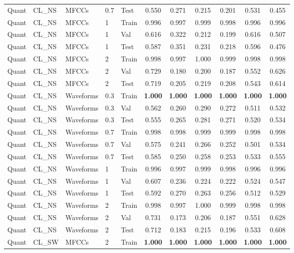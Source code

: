 \begin{landscape}
\begin{longtable}{|l|l|l|l|l|c|c|c|c|c|c|}
Quant & CL\_NS & MFCCs & 0.7 & Test & 0.550 & 0.271 & 0.215 & 0.201 & 0.531 & 0.455 \\
Quant & CL\_NS & MFCCs & 1 & Train & 0.996 & 0.997 & 0.999 & 0.998 & 0.996 & 0.996 \\
Quant & CL\_NS & MFCCs & 1 & Val & 0.616 & 0.322 & 0.212 & 0.199 & 0.616 & 0.507 \\
Quant & CL\_NS & MFCCs & 1 & Test & 0.587 & 0.351 & 0.231 & 0.218 & 0.596 & 0.476 \\
Quant & CL\_NS & MFCCs & 2 & Train & 0.998 & 0.997 & 1.000 & 0.999 & 0.998 & 0.998 \\
Quant & CL\_NS & MFCCs & 2 & Val & 0.729 & 0.180 & 0.200 & 0.187 & 0.552 & 0.626 \\
Quant & CL\_NS & MFCCs & 2 & Test & 0.719 & 0.205 & 0.219 & 0.208 & 0.543 & 0.614 \\
Quant & CL\_NS & Waveforms & 0.3 & Train & \textbf{1.000} & \textbf{1.000} & \textbf{1.000} & \textbf{1.000} & \textbf{1.000} & \textbf{1.000} \\
Quant & CL\_NS & Waveforms & 0.3 & Val & 0.562 & 0.260 & 0.290 & 0.272 & 0.511 & 0.532 \\
Quant & CL\_NS & Waveforms & 0.3 & Test & 0.555 & 0.265 & 0.281 & 0.271 & 0.520 & 0.534 \\
Quant & CL\_NS & Waveforms & 0.7 & Train & 0.998 & 0.998 & 0.999 & 0.999 & 0.998 & 0.998 \\
Quant & CL\_NS & Waveforms & 0.7 & Val & 0.575 & 0.241 & 0.266 & 0.252 & 0.501 & 0.534 \\
Quant & CL\_NS & Waveforms & 0.7 & Test & 0.585 & 0.250 & 0.258 & 0.253 & 0.533 & 0.555 \\
Quant & CL\_NS & Waveforms & 1 & Train & 0.996 & 0.997 & 0.999 & 0.998 & 0.996 & 0.996 \\
Quant & CL\_NS & Waveforms & 1 & Val & 0.607 & 0.236 & 0.224 & 0.222 & 0.524 & 0.547 \\
Quant & CL\_NS & Waveforms & 1 & Test & 0.592 & 0.270 & 0.263 & 0.256 & 0.512 & 0.529 \\
Quant & CL\_NS & Waveforms & 2 & Train & 0.998 & 0.997 & 1.000 & 0.999 & 0.998 & 0.998 \\
Quant & CL\_NS & Waveforms & 2 & Val & 0.731 & 0.173 & 0.206 & 0.187 & 0.551 & 0.628 \\
Quant & CL\_NS & Waveforms & 2 & Test & 0.712 & 0.183 & 0.215 & 0.196 & 0.533 & 0.608 \\
Quant & CL\_SW & MFCCs & 2 & Train & \textbf{1.000} & \textbf{1.000} & \textbf{1.000} & \textbf{1.000} & \textbf{1.000} & \textbf{1.000} \\

\end{longtable}
\end{landscape}
